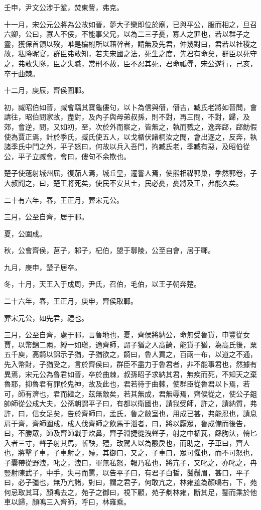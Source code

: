 \begin{pinyinscope}
壬申，尹文公涉于鞏，焚東訾，弗克。

十一月，宋公元公將為公故如晉，夢大子欒即位於廟，已與平公，服而相之，旦召六卿，公曰，寡人不佞，不能事父兄，以為二三子憂，寡人之罪也，若以群子之靈，獲保首領以歿，唯是楄柎所以藉幹者，請無及先君，仲幾對曰，君若以社稷之故，私降昵宴，群臣弗敢知，若夫宋國之法，死生之度，先君有命矣，群臣以死守之，弗敢失隊，臣之失職，常刑不赦，臣不忍其死，君命祗辱，宋公遂行，己亥，卒于曲棘。

十二月，庚辰，齊侯圍鄆。

初，臧昭伯如晉，臧會竊其寶龜僂句，以卜為信與僭，僭吉，臧氏老將如晉問，會請往，昭伯問家故，盡對，及內子與母弟叔孫，則不對，再三問，不對，歸，及郊，會逆，問，又如初，至，次於外而察之，皆無之，執而戮之，逸奔郈，郈魴假使為賈正焉，計於季氏，臧氏使五人，以戈楯伏諸桐汝之閭，會出逐之，反奔，執諸季氏中門之外，平子怒曰，何故以兵入吾門，拘臧氏老，季臧有惡，及昭伯從公，平子立臧會，會曰，僂句不余欺也。

楚子使薳射城州屈，復茄人焉，城丘皇，遷訾人焉，使熊相禖郭巢，季然郭卷，子大叔聞之，曰，楚王將死矣，使民不安其土，民必憂，憂將及王，弗能久矣。

二十有六年，春，王正月，葬宋元公。

三月，公至自齊，居于鄆。

夏，公圍成。

秋，公會齊侯，莒子，邾子，杞伯，盟于鄟陵，公至自會，居于鄆。

九月，庚申，楚子居卒。

冬，十月，天王入于成周，尹氏，召伯，毛伯，以王子朝奔楚。

二十六年，春，王正月，庚申，齊侯取鄆。

葬宋元公，如先君，禮也。

三月，公至自齊，處于鄆，言魯地也，夏，齊侯將納公，命無受魯貨，申豐從女賈，以幣錦二兩，縛一如瑱，適齊師，謂子猶之人高齮，能貨子猶，為高氏後，粟五千庾，高齮以錦示子猶，子猶欲之，齮曰，魯人買之，百兩一布，以道之不通，先入幣財，子猶受之，言於齊侯曰，群臣不盡力于魯君者，非不能事君也，然據有異焉，宋元公為魯君如晉，卒於曲棘，叔孫昭子求納其君，無疾而死，不知天之棄魯耶，抑魯君有罪於鬼神，故及此也，君若待于曲棘，使群臣從魯君以卜焉，若可，師有濟也，君而繼之，茲無敵矣，若其無成，君無辱焉，齊侯從之，使公子鉏帥師從公成大夫，公孫朝謂平子曰，有都以衛國也，請我受師，許之，請納質，弗許，曰，信女足矣，告於齊師曰，孟氏，魯之敝室也，用成已甚，弗能忍也，請息肩于齊，齊師圍成，成人伐齊師之飲馬于淄者，曰，將以厭眾，魯成備而後告，曰，不勝眾，師及齊師戰于炊鼻，齊子淵捷從洩聲子，射之中楯瓦，繇朐汏，輈匕入者三寸，聲子射其馬，斬鞅，殪，改駕人以為鬷戾也，而助之，子車曰，齊人也，將擊子車，子車射之，殪，其御曰，又之，子車曰，眾可懼也，而不可怒也，子囊帶從野洩，叱之，洩曰，軍無私怒，報乃私也，將亢子，又叱之，亦叱之，冉豎射陳武子，中手，失弓而罵，以告平子曰，有君子白皙，鬒鬚眉，甚口，平子曰，必子彊也，無乃亢諸，對曰，謂之君子，何敢亢之，林雍羞為顏鳴右，下，苑何忌取其耳，顏鳴去之，苑子之御曰，視下顧，苑子刜林雍，斷其足，鑋而乘於他車以歸，顏鳴三入齊師，呼曰，林雍乘。


\end{pinyinscope}
